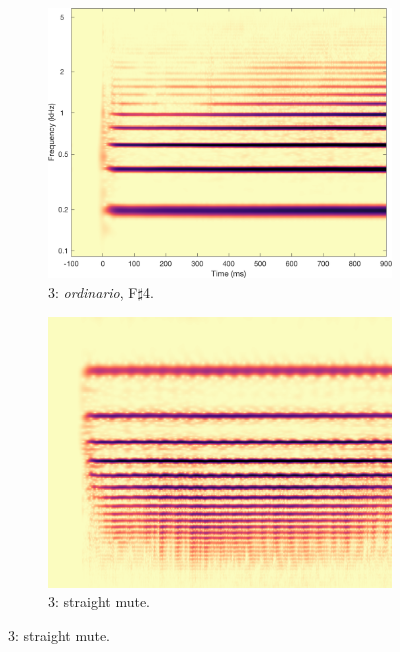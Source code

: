 \begin{figure}
        \begin{subfigure}{0.20\textwidth}
                \centering
                \includegraphics[width=\linewidth]{./figs/demo/TpC-ord-Fsh4-mf.png}
                \caption*{3: \emph{ordinario}, F$\sharp$4.}
                \label{fig:TpC-ord-Fsh4-mf}
        \end{subfigure}%
        \begin{subfigure}{0.20\textwidth}
                \centering
                \includegraphics[width=\linewidth]{./figs/demo/TpC+S-flatt-G4-mf.png}
                \caption*{3: straight mute.}
                \label{fig:TpC+S-flatt-G4-mf}
        \end{subfigure}%


\end{figure}
